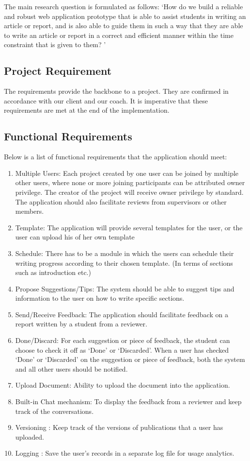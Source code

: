The main research question is formulated as follows: `How do we build a reliable and robust web application prototype that is able to assist students in writing an article or report, and is also able to guide them in such a way that they are able to write an article or report in a correct and efficient manner within the time constraint that is given to them? '

\subsection{Project Requirement}

The requirements provide the backbone to a project. They are confirmed in accordance with our client and our coach. It is imperative that these requirements are met at the end of the implementation.

\subsection{Functional Requirements} %
\label{sub:functional_requirement}

Below is a list of functional requirements that the application should meet:

\begin{enumerate}
	\item Multiple Users: Each project created by one user can be joined by multiple other users, where none or more joining participants can be attributed owner privilege. The creator of the project will receive owner privilege by standard. The application should also facilitate reviews from supervisors or other members.
	\item Template: The application will provide several templates for the user, or the user can upload his of her own template
	\item Schedule: There has to be a module in which the users can schedule their writing progress according to their chosen template. (In terms of sections such as introduction etc.)
	\item Propose Suggestions/Tips: The system should be able to suggest tips and information to the user on how to write specific sections.
	\item Send/Receive Feedback: The application should facilitate feedback on a report written by a student from a reviewer.
	\item Done/Discard: For each suggestion or piece of feedback, the student can choose to check it off as `Done' or `Discarded'. When a user has checked `Done' or `Discarded' on the suggestion or piece of feedback, both the system and all other users should be notified. 
	\item Upload Document: Ability to upload the document into the application.
	\item Built-in Chat mechanism: To display the feedback from a reviewer and keep track of the conversations. 
	\item Versioning : Keep track of the versions of publications that a user has uploaded.
	\item Logging : Save the user's records in a separate log file for usage analytics.
\end{enumerate}

